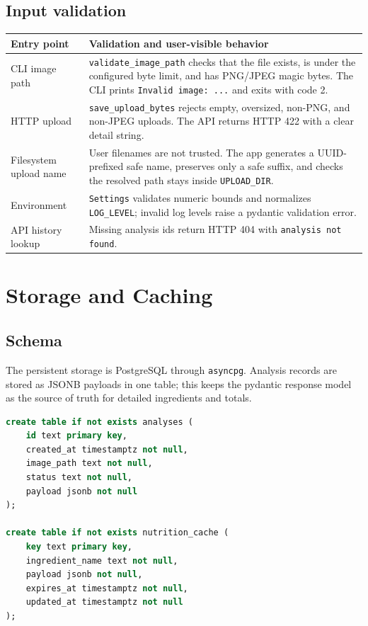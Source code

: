 \documentclass[11pt,a4paper]{article}
\begin{document}
\subsection{Input validation}

\begin{center}\small
\begin{tabularx}{\textwidth}{lX}
\toprule
\textbf{Entry point} & \textbf{Validation and user-visible behavior} \\
\midrule
CLI image path & \texttt{validate\_image\_path} checks that the file exists, is under the configured byte limit, and has PNG/JPEG magic bytes. The CLI prints \texttt{Invalid image: ...} and exits with code 2. \\
HTTP upload & \texttt{save\_upload\_bytes} rejects empty, oversized, non-PNG, and non-JPEG uploads. The API returns HTTP 422 with a clear detail string. \\
Filesystem upload name & User filenames are not trusted. The app generates a UUID-prefixed safe name, preserves only a safe suffix, and checks the resolved path stays inside \texttt{UPLOAD\_DIR}. \\
Environment & \texttt{Settings} validates numeric bounds and normalizes \texttt{LOG\_LEVEL}; invalid log levels raise a pydantic validation error. \\
API history lookup & Missing analysis ids return HTTP 404 with \texttt{analysis not found}. \\
\bottomrule
\end{tabularx}
\end{center}

\section{Storage and Caching}

\subsection{Schema}

The persistent storage is PostgreSQL through \texttt{asyncpg}. Analysis records are stored as JSONB payloads in one table; this keeps the pydantic response model as the source of truth for detailed ingredients and totals.

\begin{lstlisting}[style=python,language=sql,numbers=none,basicstyle=\ttfamily\small]
create table if not exists analyses (
    id text primary key,
    created_at timestamptz not null,
    image_path text not null,
    status text not null,
    payload jsonb not null
);

create table if not exists nutrition_cache (
    key text primary key,
    ingredient_name text not null,
    payload jsonb not null,
    expires_at timestamptz not null,
    updated_at timestamptz not null
);
\end{lstlisting}
\end{document}
